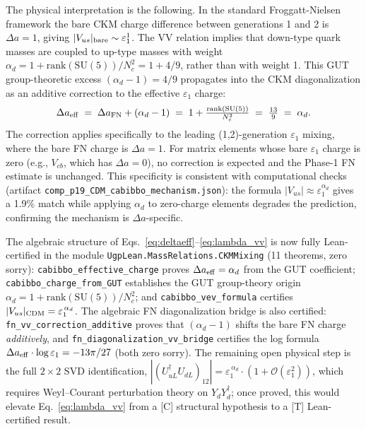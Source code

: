 \documentclass[11pt]{article}
\theoremstyle{remark}
\newcommand{\lean}[1]{\texttt{\small#1}}
\begin{document}
\begin{tcolorbox}[openbox,title=Open Problem 3 --- Full CKM + CP phase]
The physical interpretation is the following.  In the standard Froggatt-Nielsen framework the bare CKM charge difference between generations 1 and 2 is $\Delta a = 1$, giving $|V_{us}|_{\rm bare} \sim \varepsilon_1^1$.  The VV relation implies that down-type quark masses are coupled to up-type masses with weight $\alpha_d = 1 + \mathrm{rank}(\mathrm{SU}(5))/N_c^2 = 1 + 4/9$, rather than with weight 1.  This GUT group-theoretic excess $(\alpha_d - 1) = 4/9$ propagates into the CKM diagonalization as an additive correction to the effective $\varepsilon_1$ charge:
\begin{equation}
  \Delta a_{\rm eff} \;=\; \Delta a_{\rm FN} + (\alpha_d - 1)
  \;=\; 1 + \tfrac{\mathrm{rank}(\mathrm{SU}(5))}{N_c^2}
  \;=\; \tfrac{13}{9} \;=\; \alpha_d.
  \label{eq:deltaeff}
\end{equation}
The correction applies specifically to the leading (1,2)-generation $\varepsilon_1$ mixing, where the bare FN charge is $\Delta a = 1$.  For matrix elements whose bare $\varepsilon_1$ charge is zero (e.g., $V_{cb}$, which has $\Delta a = 0$), no correction is expected and the Phase-1 FN estimate is unchanged.  This specificity is consistent with computational checks (artifact \texttt{comp\_p19\_CDM\_cabibbo\_mechanism.json}): the formula $|V_{us}| \approx \varepsilon_1^{\alpha_d}$ gives a 1.9\% match while applying $\alpha_d$ to zero-charge elements degrades the prediction, confirming the mechanism is $\Delta a$-specific.

The algebraic structure of Eqs.~\eqref{eq:deltaeff}--\eqref{eq:lambda_vv} is now fully Lean-certified in the module \lean{UgpLean.MassRelations.CKMMixing} (11 theorems, zero sorry): \lean{cabibbo\_effective\_charge} proves $\Delta a_{\rm eff} = \alpha_d$ from the GUT coefficient; \lean{cabibbo\_charge\_from\_GUT} establishes the GUT group-theory origin $\alpha_d = 1 + \mathrm{rank}(\mathrm{SU}(5))/N_c^2$; and \lean{cabibbo\_vev\_formula} certifies $|V_{us}|_{\rm CDM} = \varepsilon_1^{\,\alpha_d}$.  The algebraic FN diagonalization bridge is also certified: \lean{fn\_vv\_correction\_additive} proves that $(\alpha_d - 1)$ shifts the bare FN charge \emph{additively}, and \lean{fn\_diagonalization\_vv\_bridge} certifies the log formula $\Delta a_{\rm eff} \cdot \log\varepsilon_1 = -13\pi/27$ (both zero sorry).  The remaining open physical step is the full $2\times 2$ SVD identification, $|(U_{uL}^\dagger U_{dL})_{12}| = \varepsilon_1^{\,\alpha_d}\cdot(1 + \mathcal{O}(\varepsilon_1^2))$, which requires Weyl–Courant perturbation theory on $Y_d Y_d^\dagger$; once proved, this would elevate Eq.~\eqref{eq:lambda_vv} from a [C] structural hypothesis to a [T] Lean-certified result.


\end{tcolorbox}
\end{document}
